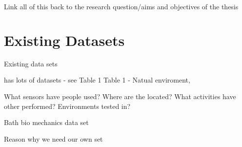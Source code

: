 Link all of this back to the research question/aims and objectives of the thesis


\section{Existing Datasets} %
Existing data sets

\cite{Cruciani2020} has lots of datasets - see Table 1
\cite{Micucci2017} Table 1
\cite{Vaizman2017} - Natual enviroment,

\cite{Fu2021}

What sensors have people used? Where are the located? What activities have other performed? Environments tested in?

Bath bio mechanics data set

Reason why we need our own set

